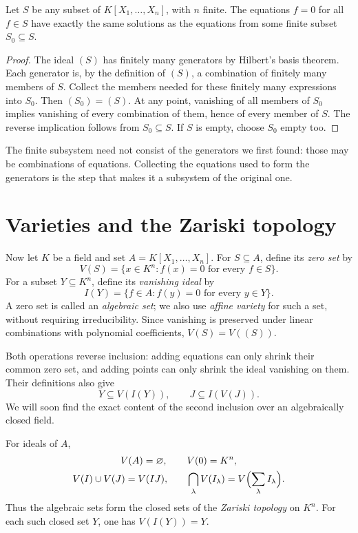 \begin{corollary}\label{cor:finitesystem}
Let $S$ be any subset of $K[X_1,\ldots,X_n]$, with $n$ finite. The equations $f=0$ for all $f\in S$ have exactly the same solutions as the equations from some finite subset $S_0\subseteq S$.
\end{corollary}

\begin{proof}
The ideal $(S)$ has finitely many generators by Hilbert's basis theorem. Each generator is, by the definition of $(S)$, a combination of finitely many members of $S$. Collect the members needed for these finitely many expressions into $S_0$. Then $(S_0)=(S)$. At any point, vanishing of all members of $S_0$ implies vanishing of every combination of them, hence of every member of $S$. The reverse implication follows from $S_0\subseteq S$. If $S$ is empty, choose $S_0$ empty too.
\end{proof}

The finite subsystem need not consist of the generators we first found: those may be combinations of equations. Collecting the equations used to form the generators is the step that makes it a subsystem of the original one.

\section{Varieties and the Zariski topology}

Now let $K$ be a field and set $A=K[X_1,\ldots,X_n]$. For $S\subseteq A$, define its \emph{zero set} by
\[
V(S)=\{x\in K^n:f(x)=0\text{ for every }f\in S\}.
\]
For a subset $Y\subseteq K^n$, define its \emph{vanishing ideal} by
\[
I(Y)=\{f\in A:f(y)=0\text{ for every }y\in Y\}.
\]
A zero set is called an \emph{algebraic set}; we also use \emph{affine variety} for such a set, without requiring irreducibility. Since vanishing is preserved under linear combinations with polynomial coefficients, $V(S)=V((S))$.

Both operations reverse inclusion: adding equations can only shrink their common zero set, and adding points can only shrink the ideal vanishing on them. Their definitions also give
\[
Y\subseteq V(I(Y)),\qquad J\subseteq I(V(J)).
\]
We will soon find the exact content of the second inclusion over an algebraically closed field.

\begin{proposition}\label{prop:zariski}
For ideals of $A$,
\[
\begin{gathered}
V(A)=\varnothing,\qquad V(0)=K^n,\\
V(I)\cup V(J)=V(IJ),\qquad
\bigcap_\lambda V(I_\lambda)=V\Bigl(\sum_\lambda I_\lambda\Bigr).
\end{gathered}
\]
Thus the algebraic sets form the closed sets of the \emph{Zariski topology} on $K^n$. For each such closed set $Y$, one has $V(I(Y))=Y$.
\end{proposition}

